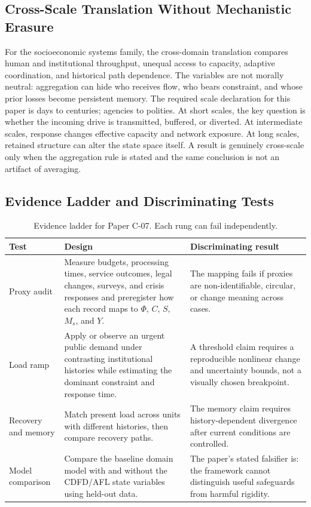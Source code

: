 \documentclass[11pt,a4paper]{article}
\begin{document}
\subsection{Cross-Scale Translation Without Mechanistic Erasure}

For the socioeconomic systems family, the cross-domain translation compares human and institutional throughput, unequal access to capacity, adaptive coordination, and historical path dependence. The variables are not morally neutral: aggregation can hide who receives flow, who bears constraint, and whose prior losses become persistent memory. \cite{BarabasiAlbert1999,WattsStrogatz1998,Holling1973,Shannon1948}
The required scale declaration for this paper is days to centuries; agencies to polities. At short
scales, the key question is whether the incoming drive is transmitted,
buffered, or diverted. At intermediate scales, response changes effective
capacity and network exposure. At long scales, retained structure can alter the
state space itself. A result is genuinely cross-scale only when the aggregation
rule is stated and the same conclusion is not an artifact of averaging.

\subsection{Evidence Ladder and Discriminating Tests}

\begin{table}[htbp]
\centering
\small
\caption{Evidence ladder for Paper C-07. Each rung can fail independently.}
\begin{tabularx}{\textwidth}{|p{}|X|X|}
\hline
\textbf{Test} & \textbf{Design} & \textbf{Discriminating result} \\
\hline
Proxy audit & Measure budgets, processing times, service outcomes, legal changes, surveys, and crisis responses and preregister how each record maps to $\Phi$, $C$, $S$, $M_s$, and $Y$. & The mapping fails if proxies are non-identifiable, circular, or change meaning across cases. \\
\hline
Load ramp & Apply or observe an urgent public demand under contrasting institutional histories while estimating the dominant constraint and response time. & A threshold claim requires a reproducible nonlinear change and uncertainty bounds, not a visually chosen breakpoint. \\
\hline
Recovery and memory & Match present load across units with different histories, then compare recovery paths. & The memory claim requires history-dependent divergence after current conditions are controlled. \\
\hline
Model comparison & Compare the baseline domain model with and without the CDFD/AFL state variables using held-out data. & The paper's stated falsifier is: the framework cannot distinguish useful safeguards from harmful rigidity. \\
\hline
\end{tabularx}
\end{table}
\end{document}
